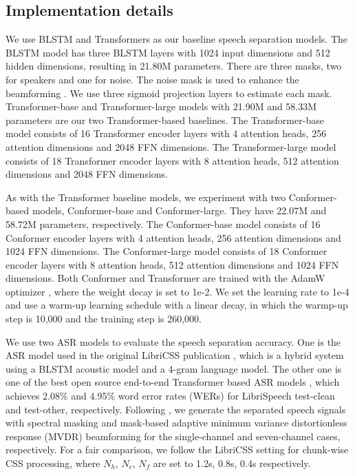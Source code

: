 \documentclass{article}
\begin{document}
	
	\subsection{Implementation details}
	We use BLSTM and Transformers as our baseline speech separation models.
	The BLSTM model has three BLSTM layers with 1024 input dimensions and 512 hidden dimensions, resulting in 21.80M parameters. There are three masks, two for speakers and one for noise. The noise mask is used to enhance the beamforming \cite{Yoshioka2018Unmix}.
	We use three sigmoid projection layers to estimate each mask.  Transformer-base and Transformer-large models with 21.90M and 58.33M parameters are our two Transformer-based baselines. The Transformer-base model consists of 16 Transformer encoder layers with 4 attention heads, 256 attention dimensions and 2048 FFN dimensions. The Transformer-large model consists of 18 Transformer encoder layers with 8 attention heads, 512 attention dimensions and 2048 FFN dimensions.
	
	As with the Transformer baseline models, we experiment with two Conformer-based models, 
	Conformer-base and Conformer-large. They have 22.07M and 58.72M parameters, respectively. The Conformer-base model consists of 16 Conformer encoder layers with 4 attention heads, 256 attention dimensions and 1024 FFN dimensions. The Conformer-large model consists of 18 Conformer encoder layers with 8 attention heads, 512 attention dimensions and 1024 FFN dimensions. 
	Both Conformer and Transformer are trained with the AdamW optimizer \cite{loshchilov2018decoupled}, where the weight decay is set to 1e-2.
	We set the learning rate to 1e-4 and use a warm-up learning schedule with a linear decay, in which the warmp-up step is 10,000 and the training step is 260,000. 
	
	We use two ASR models to evaluate the speech separation accuracy. One is the ASR model used in the original LibriCSS publication \cite{chen2020continuous}, which is a hybrid system using a BLSTM acoustic model and a 4-gram language model. The other one is one of the best open source end-to-end Transformer  based ASR models \cite{wang2019semantic}, which achieves 2.08\% and 4.95\% word error rates (WERs) for LibriSpeech test-clean and test-other, respectively. Following \cite{chen2020continuous}, we generate the separated speech signals with  spectral masking and mask-based adaptive minimum variance distortionless response (MVDR) beamforming for the single-channel and seven-channel cases, respectively. 
	For a fair comparison, we follow the LibriCSS setting for chunk-wise CSS processing, where $N_h$, $N_c$, $N_f$ are set to 1.2s, 0.8s, 0.4s respectively.
	
\end{document}
